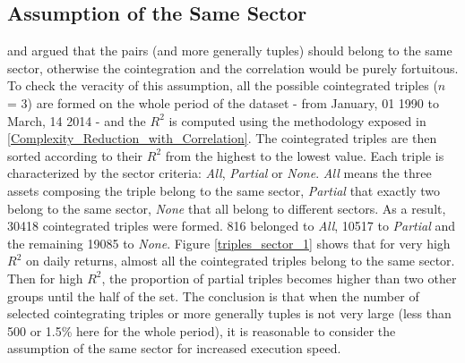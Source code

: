 \documentclass[11pt,a4,twosided,singlespacing,titlepagenumber=on]{scrreprt}
\numberwithin{equation}{chapter} %
\theoremstyle{remark}
\begin{document}
\subsection{Assumption of the Same Sector}
\cite{chan2009} and \cite{dunis2010} argued that the pairs (and more generally tuples) should belong to the same sector, otherwise the cointegration and the correlation would be purely fortuitous. To check the veracity of this assumption, all the possible cointegrated triples ($n$ = 3) are formed on the whole period of the dataset  - from January, 01 1990 to March, 14 2014 - and the $R^2$ is computed using the methodology exposed in \ref{Complexity_Reduction_with_Correlation}. The cointegrated triples are then sorted according to their $R^2$ from the highest to the lowest value. Each triple is characterized by the sector criteria: \textit{All}, \textit{Partial} or \textit{None}. \textit{All} means the three assets composing the triple belong to the same sector, \textit{Partial} that exactly two belong to the same sector, \textit{None} that all belong to different sectors. As a result, 30418 cointegrated triples were formed. 816 belonged to \textit{All}, 10517 to \textit{Partial} and the remaining 19085 to \textit{None}. Figure \ref{triples_sector_1} shows that for very high $R^2$ on daily returns, almost all the cointegrated triples belong to the same sector. Then for high $R^2$, the proportion of partial triples becomes higher than two other groups until the half of the set. The conclusion is that when the number of selected cointegrating triples or more generally tuples is not very large (less than 500 or 1.5\% here for the whole period), it is reasonable to consider the assumption of the same sector for increased execution speed.
\end{document}
